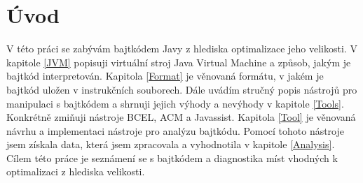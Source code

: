 \chapter{Úvod}\label{Introduction}


V této práci se zabývám bajtkódem Javy z hlediska optimalizace jeho velikosti. V kapitole \ref{JVM} popisuji virtuální stroj Java Virtual Machine a způsob, jakým je bajtkód interpretován. Kapitola \ref{Format} je věnovaná formátu, v jakém je bajtkód uložen v instrukčních souborech. Dále uvádím stručný popis nástrojů pro manipulaci s bajtkódem a shrnuji jejich výhody a nevýhody v kapitole \ref{Tools}. Konkrétně zmiňuji nástroje BCEL, ACM a Javassist. Kapitola \ref{Tool} je věnovaná návrhu a implementaci nástroje pro analýzu bajtkódu. Pomocí tohoto nástroje jsem získala data, která jsem zpracovala a vyhodnotila v kapitole \ref{Analysis}. Cílem této práce je seznámení se s bajtkódem a diagnostika míst vhodných k optimalizaci z hlediska velikosti.


